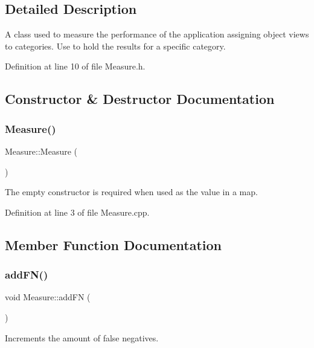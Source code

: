 \subsection{Detailed Description}
A class used to measure the performance of the application assigning object views to categories. Use to hold the results for a specific category. 

Definition at line 10 of file Measure.\+h.



\subsection{Constructor \& Destructor Documentation}
\mbox{\label{class_measure_ab55c93d6121f43c91a337fb7bcd26825}} 
\subsubsection{\texorpdfstring{Measure()}{Measure()}}
{\footnotesize\ttfamily Measure\+::\+Measure (\begin{DoxyParamCaption}{ }\end{DoxyParamCaption})}

The empty constructor is required when used as the value in a map. 

Definition at line 3 of file Measure.\+cpp.



\subsection{Member Function Documentation}
\mbox{\label{class_measure_adfac0ce9647ed61b6fdfa6c81b1e5971}} 
\subsubsection{\texorpdfstring{add\+F\+N()}{addFN()}}
{\footnotesize\ttfamily void Measure\+::add\+FN (\begin{DoxyParamCaption}{ }\end{DoxyParamCaption})\hspace{0.3cm}{\ttfamily [inline]}}

Increments the amount of false negatives. 


